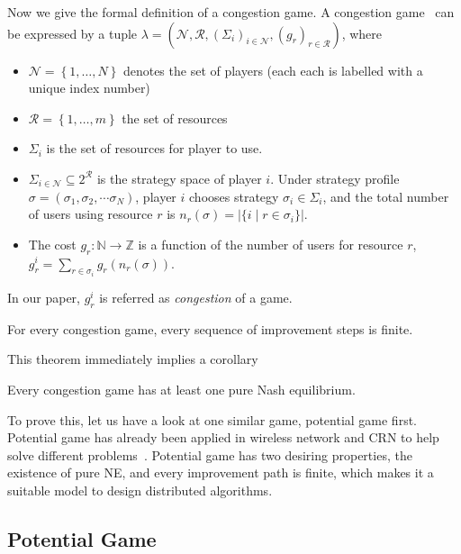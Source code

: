 Now we give the formal definition of a congestion game.
A congestion game~\cite{Rosenthal}\cite{Voecking06congestiongames} can be expressed by a tuple $\lambda=(\mathcal{N},\mathcal{R},(\Sigma_i)_{i \in \mathcal{N}},(g_r)_{r\in \mathcal{R}})$, where
\begin{itemize}
\item $\mathcal{N}=\left\{1,\ldots,N\right\}$ denotes the set of players (each each is labelled with a unique index number)
\item $\mathcal{R}=\left\{1,\ldots,m\right\}$ the set of resources
\item $\Sigma_i$ is the set of resources for player to use.
\item $\Sigma_{i\in\mathcal{N}} \subseteq 2^{\mathcal{R}}$ is the strategy space of player $i$. 
Under strategy profile $\sigma=(\sigma_1,\sigma_2,\cdots \sigma_N)$, player $i$ chooses strategy $\sigma_i\in \Sigma_i$, and the total number of users using resource $r$ is $n_r(\sigma)=|\{i\mid r\in \sigma_i\}|$. 
\item The cost $g_r: \mathbb{N}\rightarrow \mathbb{Z}$ is a function of the number of users for resource $r$, $g_r^i=\sum_{r\in \sigma_i} g_r(n_r(\sigma))$. 
\end{itemize}
In our paper, $g_r^i$ is referred as \textit{congestion} of a game.

\begin{theorem}
\label{background:finiteImprovement}
For every congestion game, every sequence of improvement steps is finite.~\cite{Rosenthal}
\end{theorem}

This theorem immediately implies a corollary
\begin{corollary}
\label{background:corollary}
Every congestion game has at least one pure Nash equilibrium.
\end{corollary}

To prove this, let us have a look at one similar game, potential game first.
Potential game has already been applied in wireless network and CRN to help solve different problems~\cite{CApotentialLearning_05dyspan, caps_potential2012, self-coexistenceWRAN2010infocom, pimrc_2012}.
Potential game has two desiring properties, the existence of pure NE, and every improvement path is finite, which makes it a suitable model to design distributed algorithms.


\subsection{Potential Game}

